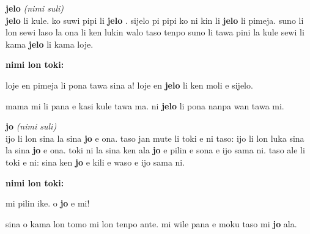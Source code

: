 \documentclass[a4paper,11pt]{book}
\newenvironment{definition}[2]{ %
  \begin{description}
  \item
    {\huge \textbf{#1}}
    {\Large \textit{(#2)}} \\
}{
  \end{description}%
}
\newenvironment{example}{ %
  \item
  \textbf{nimi lon toki:}
  
  \hfill
  \begin{minipage}{\dimexpr\textwidth-1cm}
  \begin{itshape}
}
{
  \end{itshape}
  \end{minipage}
}
\newcommand{\inex}[1]{%
  \textbf{#1}%
}
\begin{document}
\pagebreak

\begin{definition}{jelo}{nimi suli}
  \inex{jelo} li kule. ko suwi pipi li \inex{jelo}. sijelo pi pipi ko ni kin li \inex{jelo} li pimeja. suno li lon sewi laso la ona li ken lukin walo taso tenpo suno li tawa pini la kule sewi li kama \inex{jelo} li kama loje.
  \begin{example}
    loje en pimeja li pona tawa sina a! loje en \inex{jelo} li ken moli e sijelo.
    
    mama mi li pana e kasi kule tawa ma. ni \inex{jelo} li pona nanpa wan tawa mi.
  \end{example}
\end{definition}

\begin{definition}{jo}{nimi suli}
  ijo li lon sina la sina \inex{jo} e ona. taso jan mute li toki e ni taso: ijo li lon luka sina la sina \inex{jo} e ona. toki ni la sina ken ala \inex{jo} e pilin e sona e ijo sama ni. taso ale li toki e ni: sina ken \inex{jo} e kili e waso e ijo sama ni.
  \begin{example}
    mi pilin ike. o \inex{jo} e mi!

    sina o kama lon tomo mi lon tenpo ante. mi wile pana e moku taso mi \inex{jo} ala.
  \end{example}
\end{definition}
\end{document}
